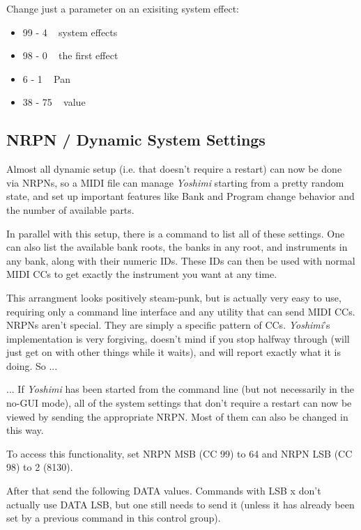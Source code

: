    Change just a parameter on an exisiting system effect:

   \begin{itemize}
      \item 99 -   4 ~ system effects
      \item 98 -   0 ~ the first effect
      \item 6 -   1 ~ Pan
      \item 38 -  75 ~ value
   \end{itemize}

\subsection{NRPN / Dynamic System Settings}
\label{subsection:nrpns_dynamic_system_settings}

   Almost all dynamic setup (i.e. that doesn't require a restart) can now be
   done via NRPNs, so a MIDI file can manage \textsl{Yoshimi} starting from a
   pretty random state, and set up important features like Bank and Program
   change behavior and the number of available parts.

   In parallel with this setup, there is a command to list all of these
   settings. One can also list the available bank roots, the banks in any
   root, and instruments in any bank, along with their numeric IDs. These IDs
   can then be used with normal MIDI CCs to get exactly the instrument you
   want at any time.

   This arrangment looks positively steam-punk, but is actually very easy to
   use, requiring only a command line interface and any utility that can send
   MIDI CCs. NRPNs aren't special. They are simply a specific pattern of CCs.
   \textsl{Yoshimi}'s implementation is very forgiving, doesn't mind if you
   stop halfway through (will just get on with other things while it waits),
   and will report exactly what it is doing.  So ...

   ... If \textsl{Yoshimi} has been started from the command line (but not
   necessarily in the no-GUI mode), all of the system settings that don't
   require a restart can now be viewed by sending the appropriate NRPN. Most
   of them can also be changed in this way.

   To access this functionality, set NRPN MSB (CC 99) to 64 and NRPN LSB (CC
   98) to 2 (8130).

   After that send the following DATA values. Commands with LSB x don't
   actually use DATA LSB, but one still needs to send it (unless it has
   already been set by a previous command in this control group).

